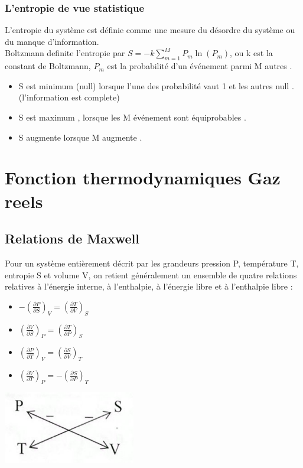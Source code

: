 \documentclass[12pt,oneside]{book}
\begin{document}
\subsection{L'entropie de vue statistique}
L'entropie du système est définie comme une mesure du désordre du système ou du manque d'information.\\
Boltzmann definite l'entropie par $S = -k\sum^M_{m=1}P_m\ln(P_m)$, ou k est la constant de Boltzmann, $P_m$ est la probabilité d'un événement parmi M autres .
\begin{itemize}
    \item S est minimum (null) lorsque l'une des probabilité vaut 1 et les autres null . (l'information est complete)
    \item S est maximum , lorsque les M événement sont équiprobables .
    \item S augmente lorsque M augmente .
\end{itemize}
\chapter{Fonction thermodynamiques Gaz reels}
\section{Relations de Maxwell}
Pour un système entièrement décrit par les grandeurs pression P, température T, entropie S et volume V, on retient généralement un ensemble de quatre relations relatives à l'énergie interne, à l'enthalpie, à l'énergie libre et à l'enthalpie libre :\\
\begin{minipage}{0.5\linewidth}
    \begin{itemize}
        \item $-(\frac{\partial P}{\partial S})_V = (\frac{\partial T}{\partial V})_S$
        \item $(\frac{\partial V}{\partial S})_P = (\frac{\partial T}{\partial P})_S$
        \item $(\frac{\partial P}{\partial T})_V = (\frac{\partial S}{\partial V})_T$
        \item $(\frac{\partial V}{\partial T})_P = -(\frac{\partial S}{\partial P})_T$
    \end{itemize}
\end{minipage}
\begin{minipage}{0.2\linewidth}
    \includegraphics[width=\linewidth]{../pic/3300/6.png}
\end{minipage}
\end{document}

